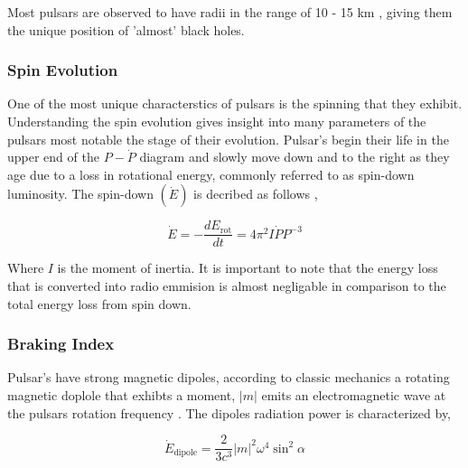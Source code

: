 Most pulsars are observed to have radii in the range of 10 - 15 km \citep{lattimer_neutron_2001}, giving them the unique position of 'almost' black holes. 

\subsubsection{Spin Evolution}
One of the most unique characterstics of pulsars is the spinning that they exhibit. Understanding the spin evolution gives insight into many parameters of the pulsars most notable the stage of their evolution. Pulsar's begin their life in the upper end of the $P-\dot P$ diagram and slowly move down and to the right as they age due to a loss in rotational energy, commonly referred to as spin-down luminosity. The spin-down $(\dot E)$ is decribed as follows  \citep[p.~59]{pulsar_handbook}, 

\begin{equation}
    \dot E  = - \dfrac{dE_{\text{rot}}}{dt} = 4\pi^2 I \dot P P^{-3}
    \label{eq:spin-down-energy}
\end{equation}

Where $I$ is the moment of inertia. It is important to note that the energy loss that is converted into radio emmision is almost negligable in comparison to the total energy loss from spin down. 




\subsubsection{Braking Index}

Pulsar's have strong magnetic dipoles, according to classic mechanics a rotating magnetic doplole that exhibts a moment, $|m|$ emits an electromagnetic wave at the pulsars rotation frequency \citep[p.~60]{pulsar_handbook}. The dipoles radiation power is characterized by, 

\begin{equation}
    \dot E_{\text{dipole}} = \frac{2}{3c^3} |m|^2 \omega^4 \sin^2 \alpha
\end{equation}

